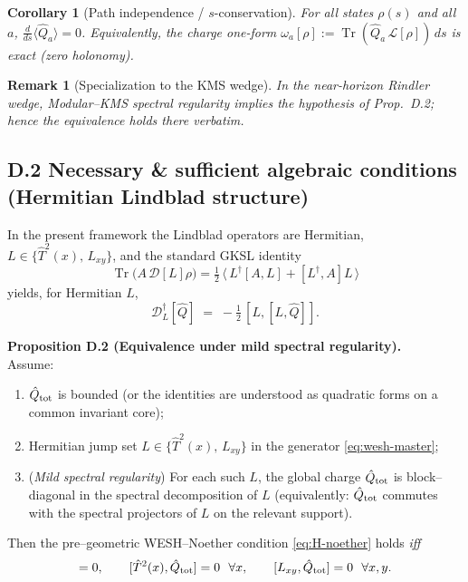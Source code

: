 \documentclass[12pt,a4paper]{article}
\newtheorem{corollary}{Corollary}[section]
\newtheorem{remark}{Remark}[section]
\renewcommand{\Tr}{\operatorname{Tr}}
\numberwithin{equation}{section}
\begin{document}
\begin{corollary}[Path independence / $s$-conservation]\label{cor:wesh-path-indep}
For all states $\rho(s)$ and all $a$, $\tfrac{d}{ds}\langle \hat Q_a\rangle=0$. Equivalently, the charge one-form $\omega_a[\rho]:=\Tr(\hat Q_a\,\mathcal L[\rho])\,ds$ is exact (zero holonomy).
\end{corollary}

\begin{remark}[Specialization to the KMS wedge]
In the near-horizon Rindler wedge, Modular--KMS spectral regularity implies the hypothesis of Prop.~D.2; hence the equivalence holds there verbatim.
\end{remark}

\vspace{0.3cm}

\subsection*{D.2 Necessary \& sufficient algebraic conditions (Hermitian Lindblad structure)}
\vspace{0.3cm}

\noindent In the present framework the Lindblad operators are Hermitian, $L\in\{\hat T^2(x),\,L_{xy}\}$, and the standard GKSL identity
\[
\Tr\!\big(A\,\mathcal D[L]\rho\big)=\tfrac12\,\big\langle\,L^\dagger[A,L]+[L^\dagger,A]L\,\big\rangle
\]
yields, for Hermitian $L$,
\begin{equation}
\mathcal D_{L}^\dagger[\hat Q]\;=\;-\tfrac12\,[L,[L,\hat Q]].
\label{eq:H-double-comm}
\end{equation}

\noindent\textbf{Proposition D.2 (Equivalence under mild spectral regularity).}\label{prop:G2}
\vspace{0.3cm}
~\\

\noindent Assume:
\begin{enumerate}[label=(\roman*),leftmargin=1.9cm,itemsep=0.2cm]
\item $\hat{Q}_{\rm tot}$ is bounded (or the identities are understood as quadratic forms on a common invariant core);
\item Hermitian jump set $L\in\{\hat T^2(x),\,L_{xy}\}$ in the generator \eqref{eq:wesh-master};
\item (\emph{Mild spectral regularity}) For each such $L$, the global charge $\hat Q_{\rm tot}$ is block–diagonal in the spectral decomposition of $L$ (equivalently: $\hat Q_{\rm tot}$ commutes with the spectral projectors of $L$ on the relevant support).
\end{enumerate}
Then the pre–geometric WESH–Noether condition \eqref{eq:H-noether} holds \emph{iff}
\begin{equation}
[H_{\mathrm{eff}},\hat Q_{\rm tot}] = 0,\qquad
[\hat T^2(x),\hat Q_{\rm tot}] = 0\ \ \forall x,\qquad
[L_{xy},\hat Q_{\rm tot}] = 0\ \ \forall x,y.
\label{eq:H-comm-all}
\end{equation}
\end{document}
